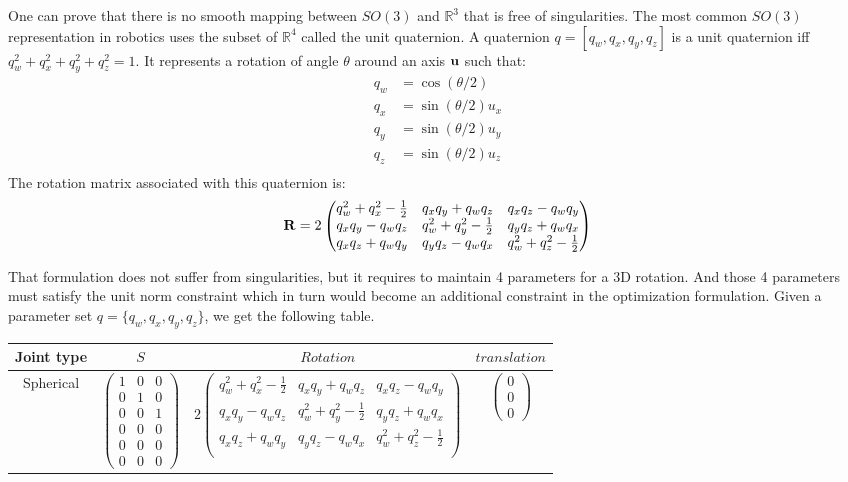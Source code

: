 One can prove that there is no smooth mapping between $SO(3)$ and $\mathbb{R}^3$ that is free of singularities.
The most common $SO(3)$ representation in robotics uses the subset of $\mathbb{R}^4$ called the unit quaternion.
A quaternion $q = [q_w, q_x, q_y, q_z]$ is a unit quaternion iff $q_w^2+q_x^2+q_y^2+q_z^2 = 1$.
It represents a rotation of angle $\theta$ around an axis ${\bf u}$ such that:
\begin{align}
  q_w &= \cos(\theta/2) \\
  q_x &= \sin(\theta/2)u_x \\
  q_y &= \sin(\theta/2)u_y \\
  q_z &= \sin(\theta/2)u_z \\
\end{align}
The rotation matrix associated with this quaternion is:
\begin{equation}
  {\bf R} = 2 \begin{pmatrix}
    q_w^2 +q_x^2-\frac{1}{2} & q_x q_y + q_w q_z & q_x q_z - q_w q_y \\
    q_x q_y - q_w q_z & q_w^2 +q_y^2-\frac{1}{2} & q_y q_z + q_w q_x \\
    q_x q_z + q_w q_y & q_y q_z - q_w q_x & q_w^2 +q_z^2-\frac{1}{2} \\
  \end{pmatrix}
\end{equation}

That formulation does not suffer from singularities, but it requires to maintain 4 parameters for a 3D rotation. And those 4 parameters must satisfy the unit norm constraint which in turn would become an additional constraint in the optimization formulation.
Given a parameter set $q = \{ q_w, q_x, q_y, q_z\}$, we get the following table.

\begin{table} [ht]
\centering
\begin{tabular}{cccc}
  \toprule
  Joint type & $S$ & $Rotation$ & $translation$ \\
  \midrule
  Spherical
  &
  $\begin{pmatrix}
    1 & 0 & 0 \\ 0 & 1 & 0 \\ 0 & 0 & 1 \\ 0 & 0 & 0 \\ 0 & 0 & 0 \\ 0 & 0 & 0
  \end{pmatrix}$
  &
  $2 \begin{pmatrix}
    q_w^2 +q_x^2-\frac{1}{2} & q_x q_y + q_w q_z & q_x q_z - q_w q_y \\
    q_x q_y - q_w q_z & q_w^2 +q_y^2-\frac{1}{2} & q_y q_z + q_w q_x \\
    q_x q_z + q_w q_y & q_y q_z - q_w q_x & q_w^2 +q_z^2-\frac{1}{2} \\
  \end{pmatrix}$
  &
  $\begin{pmatrix}
    0 \\ 0 \\ 0
  \end{pmatrix}$
  \\
  \bottomrule
\end{tabular}
\end{table}

